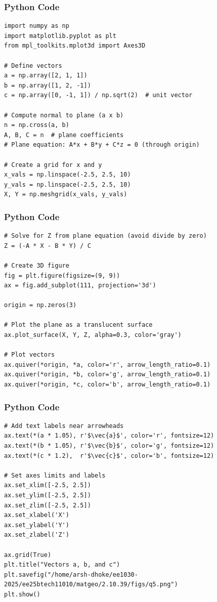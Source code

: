 \documentclass{beamer}
\begin{document}
\begin{frame}[fragile]
    \frametitle{Python Code}
\begin{lstlisting}
import numpy as np
import matplotlib.pyplot as plt
from mpl_toolkits.mplot3d import Axes3D

# Define vectors
a = np.array([2, 1, 1])
b = np.array([1, 2, -1])
c = np.array([0, -1, 1]) / np.sqrt(2)  # unit vector

# Compute normal to plane (a x b)
n = np.cross(a, b)
A, B, C = n  # plane coefficients
# Plane equation: A*x + B*y + C*z = 0 (through origin)

# Create a grid for x and y
x_vals = np.linspace(-2.5, 2.5, 10)
y_vals = np.linspace(-2.5, 2.5, 10)
X, Y = np.meshgrid(x_vals, y_vals)
\end{lstlisting}
\end{frame}

\begin{frame}[fragile]
    \frametitle{Python Code}
\begin{lstlisting}
# Solve for Z from plane equation (avoid divide by zero)
Z = (-A * X - B * Y) / C

# Create 3D figure
fig = plt.figure(figsize=(9, 9))
ax = fig.add_subplot(111, projection='3d')

origin = np.zeros(3)

# Plot the plane as a translucent surface
ax.plot_surface(X, Y, Z, alpha=0.3, color='gray')

# Plot vectors
ax.quiver(*origin, *a, color='r', arrow_length_ratio=0.1)
ax.quiver(*origin, *b, color='g', arrow_length_ratio=0.1)
ax.quiver(*origin, *c, color='b', arrow_length_ratio=0.1)
\end{lstlisting}
\end{frame}

\begin{frame}[fragile]
    \frametitle{Python Code}
\begin{lstlisting}
# Add text labels near arrowheads
ax.text(*(a * 1.05), r'$\vec{a}$', color='r', fontsize=12)
ax.text(*(b * 1.05), r'$\vec{b}$', color='g', fontsize=12)
ax.text(*(c * 1.2),  r'$\vec{c}$', color='b', fontsize=12)

# Set axes limits and labels
ax.set_xlim([-2.5, 2.5])
ax.set_ylim([-2.5, 2.5])
ax.set_zlim([-2.5, 2.5])
ax.set_xlabel('X')
ax.set_ylabel('Y')
ax.set_zlabel('Z')

ax.grid(True)
plt.title("Vectors a, b, and c")
plt.savefig("/home/arsh-dhoke/ee1030-2025/ee25btech11010/matgeo/2.10.39/figs/q5.png")
plt.show()

\end{lstlisting}
\end{frame}
\end{document}
